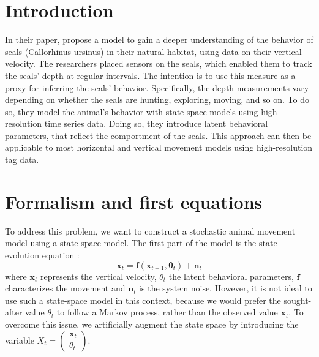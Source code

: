 \section{Introduction}

In their paper, \citet{dowd2011estimating} propose a model to gain a deeper understanding of the behavior of seals (Callorhinus ursinus) in their natural habitat, using data on their vertical velocity. The researchers placed sensors on the seals, which enabled them to track the seals' depth at regular intervals. The intention is to use this measure as a proxy for inferring the seals' behavior. Specifically, the depth measurements vary depending on whether the seals are hunting, exploring, moving, and so on. To do so, they model the animal's behavior with state-space models using high resolution time series data. Doing so, they introduce latent behavioral parameters, that reflect the comportment of the seals. This approach can then be applicable to most horizontal and vertical movement models using high-resolution tag data.


\section{Formalism and first equations}

To address this problem, we want to construct a stochastic animal movement model using a state-space model.
The first part of the model is the state evolution equation :
\begin{equation}
\mathbf{x}_t=\mathbf{f}(\mathbf{x}_{t-1},\mathbf{\theta}_t)+\mathbf{n}_t
\end{equation}
where $\mathbf{x}_t$ represents the vertical velocity, $\theta_t$ the latent behavioral parameters, $\mathbf{f}$ characterizes the movement and $\mathbf{n}_t$ is the system noise. However, it is not ideal to use such a state-space model in this context, because we would prefer the sought-after value $\theta_t$ to follow a Markov process, rather than the observed value $\mathbf{x}_t$.
To overcome this issue, we artificially augment the state space by introducing the variable $X_t = \begin{pmatrix}
\mathbf{x}_t\\\theta_t
\end{pmatrix}$.

